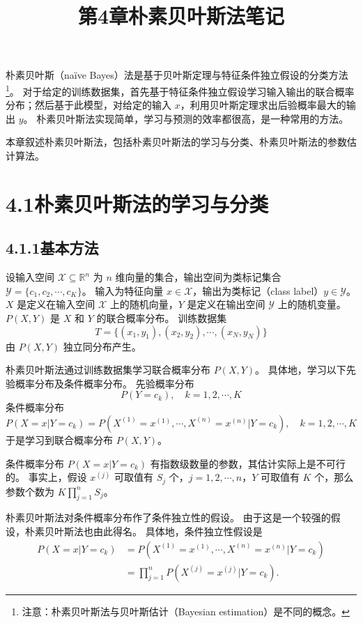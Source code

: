 \documentclass[UTF8,12pt,a4paper,fontset=fandol]{ctexart}
\title{第4章\quad 朴素贝叶斯法笔记}
\author{}
\date{}
\begin{document}
\maketitle

朴素贝叶斯（naïve Bayes）法是基于贝叶斯定理与特征条件独立假设的分类方法\footnote{注意：朴素贝叶斯法与贝叶斯估计（Bayesian estimation）是不同的概念。}。
对于给定的训练数据集，首先基于特征条件独立假设学习输入输出的联合概率分布；然后基于此模型，对给定的输入 $x$，利用贝叶斯定理求出后验概率最大的输出 $y$。
朴素贝叶斯法实现简单，学习与预测的效率都很高，是一种常用的方法。

本章叙述朴素贝叶斯法，包括朴素贝叶斯法的学习与分类、朴素贝叶斯法的参数估计算法。

\section*{4.1\quad 朴素贝叶斯法的学习与分类}

\subsection*{4.1.1\quad 基本方法}

设输入空间 $\mathcal{X}\subseteq \mathbb{R}^n$ 为 $n$ 维向量的集合，输出空间为类标记集合 $\mathcal{Y}=\{c_1,c_2,\cdots,c_K\}$。
输入为特征向量 $x\in\mathcal{X}$，输出为类标记（class label）$y\in\mathcal{Y}$。
$X$ 是定义在输入空间 $\mathcal{X}$ 上的随机向量，$Y$ 是定义在输出空间 $\mathcal{Y}$ 上的随机变量。
$P(X,Y)$ 是 $X$ 和 $Y$ 的联合概率分布。
训练数据集
\[
  T=\{(x_1,y_1),(x_2,y_2),\cdots,(x_N,y_N)\}
\]
由 $P(X,Y)$ 独立同分布产生。

朴素贝叶斯法通过训练数据集学习联合概率分布 $P(X,Y)$。
具体地，学习以下先验概率分布及条件概率分布。
先验概率分布
\begin{equation}
  P(Y=c_k),\quad k=1,2,\cdots,K
  \tag{4.1}
\end{equation}
条件概率分布
\begin{equation}
  P(X=x|Y=c_k)=P(X^{(1)}=x^{(1)},\cdots,X^{(n)}=x^{(n)}|Y=c_k),
  \quad k=1,2,\cdots,K
  \tag{4.2}
\end{equation}
于是学习到联合概率分布 $P(X,Y)$。

条件概率分布 $P(X=x|Y=c_k)$ 有指数级数量的参数，其估计实际上是不可行的。
事实上，假设 $x^{(j)}$ 可取值有 $S_j$ 个，$j=1,2,\cdots,n$，$Y$ 可取值有 $K$ 个，那么参数个数为 $K\prod_{j=1}^n S_j$。

朴素贝叶斯法对条件概率分布作了条件独立性的假设。
由于这是一个较强的假设，朴素贝叶斯法也由此得名。
具体地，条件独立性假设是
\begin{equation}
\begin{aligned}
  P(X=x|Y=c_k)
  &=P(X^{(1)}=x^{(1)},\cdots,X^{(n)}=x^{(n)}|Y=c_k) \\
  &=\prod_{j=1}^n P(X^{(j)}=x^{(j)}|Y=c_k).
\end{aligned}
\tag{4.3}
\end{equation}
\end{document}
